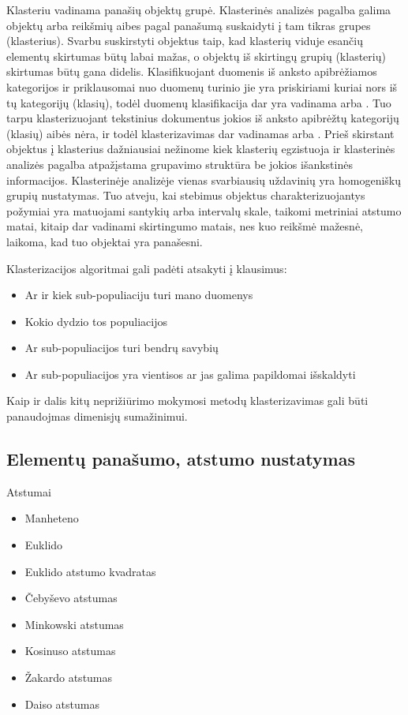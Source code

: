 \documentclass{VUMIFInfKursinis}
\begin{document}
Klasteriu vadinama panašių objektų grupė. Klasterinės analizės pagalba galima objektų arba reikšmių aibes pagal panašumą suskaidyti į tam tikras grupes (klasterius). Svarbu suskirstyti objektus taip, kad klasterių viduje esančių elementų skirtumas būtų labai mažas, o objektų iš skirtingų grupių (klasterių) skirtumas būtų gana didelis. 
Klasifikuojant duomenis iš anksto apibrėžiamos kategorijos ir priklausomai nuo duomenų turinio jie yra priskiriami kuriai nors iš tų kategorijų (klasių), todėl duomenų klasifikacija dar yra vadinama  arba . Tuo tarpu klasterizuojant tekstinius dokumentus jokios iš anksto apibrėžtų kategorijų (klasių) aibės nėra, ir todėl klasterizavimas dar vadinamas  arba . Prieš skirstant objektus į klasterius dažniausiai nežinome kiek klasterių egzistuoja ir klasterinės analizės pagalba atpažįstama grupavimo struktūra be jokios išankstinės informacijos. 
Klasterinėje analizėje vienas svarbiausių uždavinių yra homogeniškų grupių nustatymas. Tuo atveju, kai stebimus objektus charakterizuojantys požymiai yra matuojami santykių arba intervalų skale, taikomi metriniai atstumo matai, kitaip dar vadinami skirtingumo matais, nes kuo reikšmė mažesnė, laikoma, kad tuo objektai yra panašesni.

Klasterizacijos algoritmai gali padėti atsakyti į klausimus:
\begin{itemize}
	\item Ar ir kiek sub-populiaciju turi mano duomenys
	\item Kokio dydzio tos populiacijos
	\item Ar sub-populiacijos turi bendrų savybių
	\item Ar sub-populiacijos yra vientisos ar jas galima papildomai išskaldyti
\end{itemize}
Kaip ir dalis kitų neprižiūrimo mokymosi metodų klasterizavimas gali būti panaudojmas dimenisjų sumažinimui. 
\subsection{Elementų panašumo, atstumo nustatymas}
Atstumai
\begin{itemize}
	\item Manheteno
	\item Euklido
	\item Euklido atstumo kvadratas
	\item Čebyševo atstumas 
	\item Minkowski atstumas 
	\item Kosinuso atstumas 
	\item Žakardo atstumas 
	\item Daiso atstumas 
\end{itemize}
\end{document}

